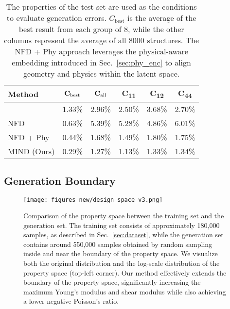 \begin{table}[ht]
    \centering
    \caption{
    The properties of the test set are used as the conditions to evaluate generation errors.
    $C_{\text{best}}$ is the average of the best result from each group of 8, while the other columns represent the average of all 8000 structures. The NFD + Phy approach leverages the physical-aware embedding introduced in Sec.~\ref{sec:phy_enc} to align geometry and physics within the latent space.}
    \label{tab:error_comparison}
    \begin{tabular}{lcc|ccc}
        \toprule
        Method                      & $\mathbf{C}_{\text{best}}$  & $\mathbf{C}_{\text{all}}$ & C\textsubscript{11} & C\textsubscript{12} & C\textsubscript{44} \\
        \midrule
        \cite{Yang2024}             & 1.33\% & 2.96\% & 2.50\% & 3.68\% & 2.70\% \\
        NFD                         & 0.63\% & 5.39\% & 5.28\% & 4.86\% & 6.01\% \\
        NFD + Phy                   & 0.44\% & 1.68\% & 1.49\% & 1.80\% & 1.75\% \\
        MIND (Ours)                 & 0.29\% & 1.27\% & 1.13\% & 1.33\% & 1.34\% \\
        \bottomrule
    \end{tabular}

\end{table}



\subsection{Generation Boundary}

\begin{figure}
    \centering
    \texttt{[image: figures\_new/design\_space\_v3.png]}
    \caption{Comparison of the property space between the training set and the generation set.
    The training set consists of approximately 180,000 samples, as described in Sec.~\ref{sec:dataset}, while the generation set contains around 550,000 samples obtained by random sampling inside and near the boundary of the property space.
    We visualize both the original distribution and the log-scale distribution of the property space (top-left corner).
    Our method effectively extends the boundary of the property space, significantly increasing the maximum Young's modulus and shear modulus while also achieving a lower negative Poisson's ratio.}
    \label{fig:design_space}
\end{figure} 


